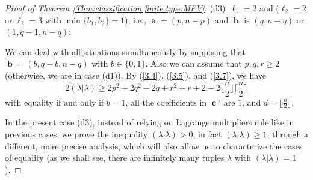 \documentclass[12pt,reqno]{amsart}
\begin{document}
\begin{proof}[Proof  of Theorem \ref{Thm:classification.finite.type.MFV}]
\bigskip
\noindent
(d3)\  $\ell_1=2$ and ($\ell_2=2$ or $\ell_2=3$ with $\min\{b_1,b_2\}=1$),
i.e., $\mbfa=(p,n-p)$ and $\mbfb$ is $(q,n-q)$ or $(1,q-1,n-q)$:

We can deal with all situations simultaneously by supposing that $\mbfb=(b,q-b,n-q)$ with $b\in\{0,1\}$.
Also we can assume that $p,q,r\geq 2$ (otherwise, we are in case (d1)).
By (\ref{3.4}), (\ref{3.5}), and (\ref{3.7}), we have
\begin{equation}
\label{d3:estimate1}
2(\lambda|\lambda) \geq 2p^2+2q^2-2q+r^2+r+2-2\Big\lfloor\frac{n}{2}\Big\rfloor \Big\lceil\frac{n}{2}\Big\rceil
\end{equation}
with equality if and only if
$b=1$, all the coefficients in $\mbfc'$ are $1$, and $d=\lfloor\frac{n}{2}\rfloor$.

In the present case (d3), instead of relying on Lagrange multipliers rule like in previous cases, we prove the inequality $(\lambda|\lambda)>0$, in fact $(\lambda|\lambda)\geq 1$, through a different, more precise analysis, which will also allow us to characterize the cases of equality
(as we shall see, there are infinitely many tuples $\lambda$ with $(\lambda|\lambda)=1$).

%


\end{proof}
\end{document}
